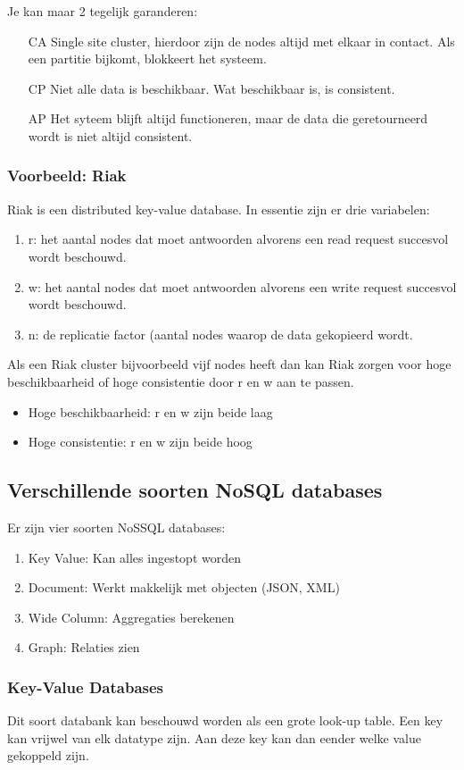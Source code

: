 \documentclass[a4paper,12pt]{article}
\begin{document}
Je kan maar 2 tegelijk garanderen:
\begin{itemize}
\item[CA] Single site cluster, hierdoor zijn de nodes altijd met elkaar in contact. Als een partitie bijkomt, blokkeert het systeem.
\item[CP] Niet alle data is beschikbaar. Wat beschikbaar is, is consistent.
\item[AP] Het syteem blijft altijd functioneren, maar de data die geretourneerd wordt is niet altijd consistent.
\end{itemize}

\subsubsection{Voorbeeld: Riak}
Riak is een distributed key-value database.
In essentie zijn er drie variabelen:
\begin{enumerate}
\item r: het aantal nodes dat moet antwoorden alvorens een read request succesvol wordt beschouwd.
\item w: het aantal nodes dat moet antwoorden alvorens een write request succesvol wordt beschouwd.
\item n: de replicatie factor (aantal nodes waarop de data gekopieerd wordt.
\end{enumerate}

Als een Riak cluster bijvoorbeeld vijf nodes heeft dan kan Riak zorgen voor hoge beschikbaarheid of hoge consistentie door r en w aan te passen.
\begin{itemize}
\item Hoge beschikbaarheid: r en w zijn beide laag
\item Hoge consistentie: r en w zijn beide hoog
\end{itemize}

\subsection{Verschillende soorten NoSQL databases}
Er zijn vier soorten NoSSQL databases:

\begin{enumerate}
\item Key Value: Kan alles ingestopt worden
\item Document: Werkt makkelijk met objecten (JSON, XML)
\item Wide Column: Aggregaties berekenen
\item Graph: Relaties zien
\end{enumerate}

\subsubsection{Key-Value Databases}
Dit soort databank kan beschouwd worden als een grote look-up table.
Een key kan vrijwel van elk datatype zijn.
Aan deze key kan dan eender welke value gekoppeld zijn.
\end{document}
